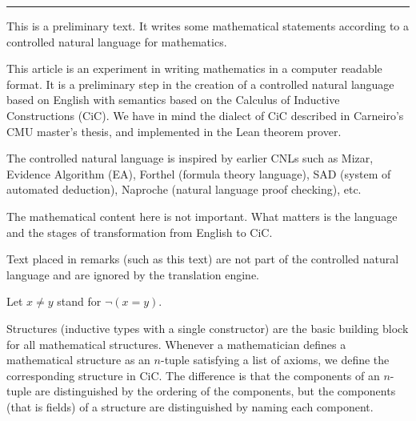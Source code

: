 \documentclass[12pt]{article}
\begin{document}
\begin{cnl}
\CnlDelete\noindent
\CnlDelete\indent
\CnlDelete[1]\vspace
\CnlDelete\null
\CnlDelete\break
\CnlDelete\newline
\CnlDelete\newpage
\CnlDelete\vfil
\CnlDelete\vfill
\CnlDelete\smallskip
\CnlDelete\medskip
\CnlDelete\bigskip
\CnlDelete[2]\rule
\CnlDelete[1]\parenthetical




\begin{remark}
This is a preliminary text.  It
writes some mathematical statements according to a
controlled natural language for mathematics.
\end{remark}



\begin{remark}
This article is an experiment in writing mathematics in a computer
readable format.  It is a preliminary step in the creation of a
controlled natural language based on English with semantics based on
the Calculus of Inductive Constructions (CiC).  We have in mind the
dialect of CiC described in Carneiro's CMU master's thesis, and
implemented in the Lean theorem prover.

The controlled natural language is inspired by earlier CNLs such as
Mizar, Evidence Algorithm (EA), Forthel (formula theory language), SAD
(system of automated deduction), Naproche (natural language proof
checking), etc.

The mathematical content here is not important.  What matters is the
language and the stages of transformation from English to CiC.

Text placed in remarks (such as this text) are not part of the
controlled natural language and are ignored by the translation engine.
\end{remark}


Let $x \ne y$ stand for $\neg(x = y)$.

\begin{remark}
Structures (inductive types with a single constructor) are the basic
building block for all mathematical structures. Whenever a
mathematician defines a mathematical structure as an $n$-tuple
satisfying a list of axioms, we define the corresponding
structure in CiC. The difference is that the components of an
$n$-tuple are distinguished by the ordering of the components, but the
components (that is fields) of a structure are distinguished by naming
each component.


\end{remark}
\end{cnl}
\end{document}
